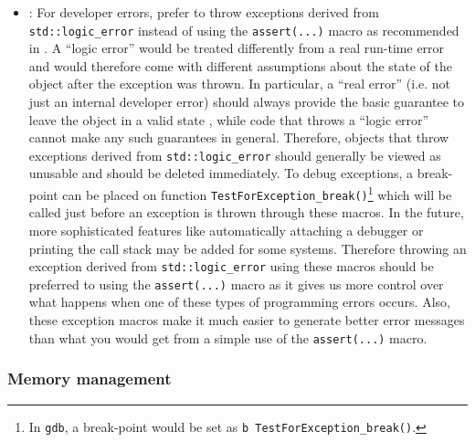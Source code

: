 \begin{itemize}


{}\item\GCGTestForException: For developer errors, prefer to throw
exceptions derived from {}\texttt{std\-::logic\-\_error} instead of
using the {}\texttt{assert(...)}  macro as recommended in {}\cite[Item
68]{C++CodingStandards05}.  A ``logic error'' would be treated
differently from a real run-time error and would therefore come with
different assumptions about the state of the object after the
exception was thrown.  In particular, a ``real error'' (i.e. not just
an internal developer error) should always provide the basic guarantee
to leave the object in a valid state {}\cite[Item
71]{C++CodingStandards05}, while code that throws a ``logic error''
cannot make any such guarantees in general.  Therefore, objects that
throw exceptions derived from {}\texttt{std\-::logic\-\_error} should
generally be viewed as unusable and should be deleted immediately.  To
debug exceptions, a break-point can be placed on function
{}\texttt{Test\-For\-Exception\-\_break()}\footnote{In {}\texttt{gdb},
a break-point would be set as {}\texttt{b
Test\-For\-Exception\-\_break()}.} which will be called just before an
exception is thrown through these macros.  In the future, more
sophisticated features like automatically attaching a debugger or
printing the call stack may be added for some systems.  Therefore
throwing an exception derived from {}\texttt{std\-::logic\-\_error}
using these macros should be preferred to using the
{}\texttt{assert(...)} macro as it gives us more control over what
happens when one of these types of programming errors occurs.  Also,
these exception macros make it much easier to generate better error
messages than what you would get from a simple use of the
{}\texttt{assert(...)} macro.


\end{itemize}


%
\subsubsection{Memory management}
%


